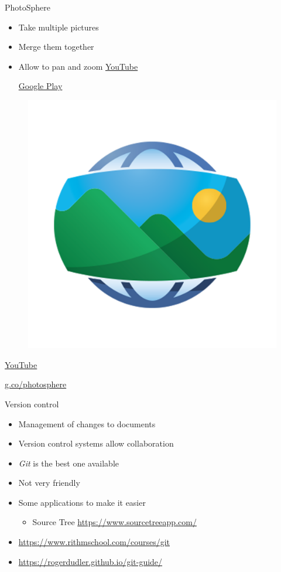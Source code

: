 \documentclass[serif,14pt,color=usenames,dvipsnames]{beamer}
\begin{document}
\begin{frame}{PhotoSphere}

  \begin{itemize}
    \item Take multiple pictures
    \item Merge them together
    \item Allow to pan and zoom  \href{https://www.youtube.com/watch?v=zAcMvZpTeBo}{YouTube }

  \href{https://play.google.com/store/apps/details?id=com.mobilicy.docscanner}{Google
  Play }

  \end{itemize}

  \centering

  \begin{figure}
  \includegraphics[width=0.3\linewidth]{imgs/photosphere}
  \end{figure}

  \href{https://www.youtube.com/watch?v=NPs3eIiWRaw}{YouTube }

  \href{https://g.co/photosphere}{g.co/photosphere }

\end{frame}

\begin{frame}{Version control}
  \small
  \begin{itemize}
    \item Management of changes to documents
    \item Version control systems allow collaboration
    \item \emph{Git} is the best one available
    \item Not very friendly
    \item Some applications to make it easier
     \begin{itemize}
       \item Source Tree \url{https://www.sourcetreeapp.com/}
     \end{itemize}
    \item \url{https://www.rithmschool.com/courses/git}
    \item \url{https://rogerdudler.github.io/git-guide/}
  \end{itemize}
\end{frame}
\end{document}
